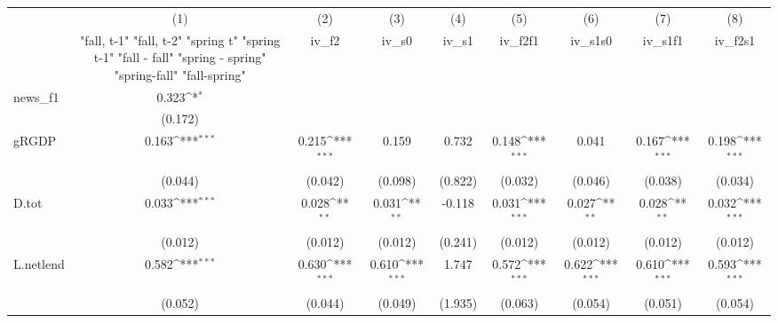 {
\def\sym#1{\ifmmode^{#1}\else\(^{#1}\)\fi}
\begin{tabular}{l*{8}{c}}
\toprule
            &\multicolumn{1}{c}{(1)}&\multicolumn{1}{c}{(2)}&\multicolumn{1}{c}{(3)}&\multicolumn{1}{c}{(4)}&\multicolumn{1}{c}{(5)}&\multicolumn{1}{c}{(6)}&\multicolumn{1}{c}{(7)}&\multicolumn{1}{c}{(8)}\\
            &\multicolumn{1}{c}{  "fall, t-1" "fall, t-2" "spring t" "spring t-1"  "fall - fall" "spring - spring" "spring-fall" "fall-spring" }&\multicolumn{1}{c}{iv\_f2}&\multicolumn{1}{c}{iv\_s0}&\multicolumn{1}{c}{iv\_s1}&\multicolumn{1}{c}{iv\_f2f1}&\multicolumn{1}{c}{iv\_s1s0}&\multicolumn{1}{c}{iv\_s1f1}&\multicolumn{1}{c}{iv\_f2s1}\\
\midrule
news\_f1     &       0.323\sym{*}  &                     &                     &                     &                     &                     &                     &                     \\
            &     (0.172)         &                     &                     &                     &                     &                     &                     &                     \\
\addlinespace
gRGDP       &       0.163\sym{***}&       0.215\sym{***}&       0.159         &       0.732         &       0.148\sym{***}&       0.041         &       0.167\sym{***}&       0.198\sym{***}\\
            &     (0.044)         &     (0.042)         &     (0.098)         &     (0.822)         &     (0.032)         &     (0.046)         &     (0.038)         &     (0.034)         \\
\addlinespace
D.tot       &       0.033\sym{***}&       0.028\sym{**} &       0.031\sym{**} &      -0.118         &       0.031\sym{***}&       0.027\sym{**} &       0.028\sym{**} &       0.032\sym{***}\\
            &     (0.012)         &     (0.012)         &     (0.012)         &     (0.241)         &     (0.012)         &     (0.012)         &     (0.012)         &     (0.012)         \\
\addlinespace
L.netlend   &       0.582\sym{***}&       0.630\sym{***}&       0.610\sym{***}&       1.747         &       0.572\sym{***}&       0.622\sym{***}&       0.610\sym{***}&       0.593\sym{***}\\
            &     (0.052)         &     (0.044)         &     (0.049)         &     (1.935)         &     (0.063)         &     (0.054)         &     (0.051)         &     (0.054)         \\

\end{tabular}}
